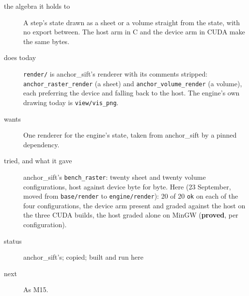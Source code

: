 \begin{description}
\item[{the algebra it holds to}] A step's state drawn as a sheet or a volume straight from the state, with no export between. The host arm in C and the device arm in CUDA make the same bytes.
\item[{does today}] \texttt{render/\allowbreak{}} is anchor\_\allowbreak{}sift's renderer with its comments stripped: \texttt{anchor\_\allowbreak{}raster\_\allowbreak{}render} (a sheet) and \texttt{anchor\_\allowbreak{}volume\_\allowbreak{}render} (a volume), each preferring the device and falling back to the host. The engine's own drawing today is \texttt{view/\allowbreak{}vis\_\allowbreak{}png}.
\item[{wants}] One renderer for the engine's state, taken from anchor\_\allowbreak{}sift by a pinned dependency.
\item[{tried, and what it gave}] anchor\_\allowbreak{}sift's \texttt{bench\_\allowbreak{}raster}: twenty sheet and twenty volume configurations, host against device byte for byte. Here (23 September, moved from \texttt{base/\allowbreak{}render} to \texttt{engine/\allowbreak{}render}): 20 of 20 \texttt{ok} on each of the four configurations, the device arm present and graded against the host on the three CUDA builds, the host graded alone on MinGW (\textbf{proved}, per configuration).
\item[{status}] anchor\_\allowbreak{}sift's; copied; built and run here
\item[{next}] As M15.
\end{description}

